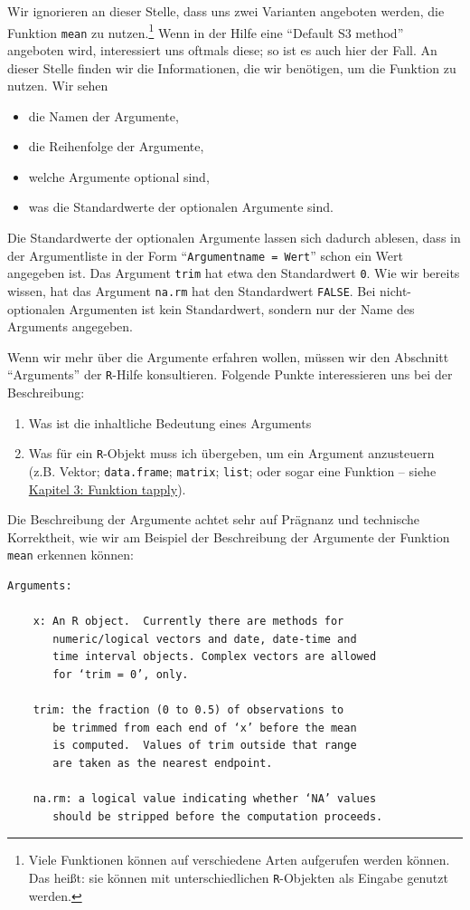 \documentclass[12pt,]{tufte-book}
\providecommand{\tightlist}{%
  \setlength{\itemsep}{0pt}\setlength{\parskip}{0pt}}
\theoremstyle{definition}
\theoremstyle{definition}
\theoremstyle{definition}
\theoremstyle{remark}
\begin{document}
Wir ignorieren an dieser Stelle, dass uns zwei Varianten angeboten
werden, die Funktion \texttt{mean} zu nutzen.\footnote{Viele Funktionen
  können auf verschiedene Arten aufgerufen werden können. Das heißt: sie
  können mit unterschiedlichen \texttt{R}-Objekten als Eingabe genutzt
  werden.} Wenn in der Hilfe eine ``Default S3 method'' angeboten wird,
interessiert uns oftmals diese; so ist es auch hier der Fall. An dieser
Stelle finden wir die Informationen, die wir benötigen, um die Funktion
zu nutzen. Wir sehen

\begin{itemize}
\tightlist
\item
  die Namen der Argumente,
\item
  die Reihenfolge der Argumente,
\item
  welche Argumente optional sind,
\item
  was die Standardwerte der optionalen Argumente sind.
\end{itemize}

Die Standardwerte der optionalen Argumente lassen sich dadurch ablesen,
dass in der Argumentliste in der Form ``\texttt{Argumentname\ =\ Wert}''
schon ein Wert angegeben ist. Das Argument \texttt{trim} hat etwa den
Standardwert \texttt{0}. Wie wir bereits wissen, hat das Argument
\texttt{na.rm} hat den Standardwert \texttt{FALSE}. Bei nicht-optionalen
Argumenten ist kein Standardwert, sondern nur der Name des Arguments
angegeben.

Wenn wir mehr über die Argumente erfahren wollen, müssen wir den
Abschnitt ``Arguments'' der \texttt{R}-Hilfe konsultieren. Folgende
Punkte interessieren uns bei der Beschreibung:

\begin{enumerate}
\def\labelenumi{\arabic{enumi}.}
\tightlist
\item
  Was ist die inhaltliche Bedeutung eines Arguments
\item
  Was für ein \texttt{R}-Objekt muss ich übergeben, um ein Argument
  anzusteuern (z.B. Vektor; \texttt{data.frame}; \texttt{matrix};
  \texttt{list}; oder sogar eine Funktion -- siehe
  \protect\hyperlink{tapply}{Kapitel 3: Funktion tapply}).
\end{enumerate}

Die Beschreibung der Argumente achtet sehr auf Prägnanz und technische
Korrektheit, wie wir am Beispiel der Beschreibung der Argumente der
Funktion \texttt{mean} erkennen können:

\begin{verbatim}
Arguments:

    x: An R object.  Currently there are methods for 
       numeric/logical vectors and date, date-time and
       time interval objects. Complex vectors are allowed
       for ‘trim = 0’, only.

    trim: the fraction (0 to 0.5) of observations to
       be trimmed from each end of ‘x’ before the mean
       is computed.  Values of trim outside that range
       are taken as the nearest endpoint.

    na.rm: a logical value indicating whether ‘NA’ values
       should be stripped before the computation proceeds.
\end{verbatim}
\end{document}
